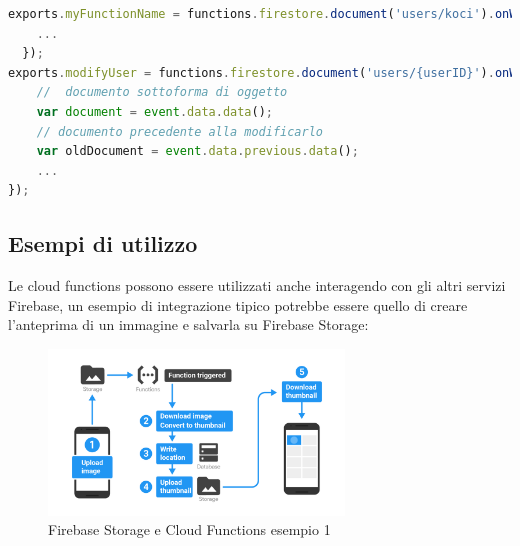 \begin{lstlisting}[language=javascript,caption={Cloud functions esempio 1 }]
exports.myFunctionName = functions.firestore.document('users/koci').onWrite((event) => {
    ...
  });
exports.modifyUser = functions.firestore.document('users/{userID}').onWrite(event => {
    //  documento sottoforma di oggetto
    var document = event.data.data();
    // documento precedente alla modificarlo
    var oldDocument = event.data.previous.data();
    ...
});
\end{lstlisting}


\newpage              %
\subsection{Esempi di utilizzo}
Le cloud functions possono essere utilizzati anche interagendo con gli altri servizi Firebase, un esempio di integrazione tipico potrebbe essere quello di creare l'anteprima di un immagine e salvarla su Firebase Storage:

\begin{figure}[!hb]

  \includegraphics[width=0.7\textwidth]{immagini/functions_ex1.png}
  \caption{Firebase Storage e Cloud Functions esempio 1}\label{fig:Firebase Storage e Cloud Functions esempio 1}
\end{figure}

